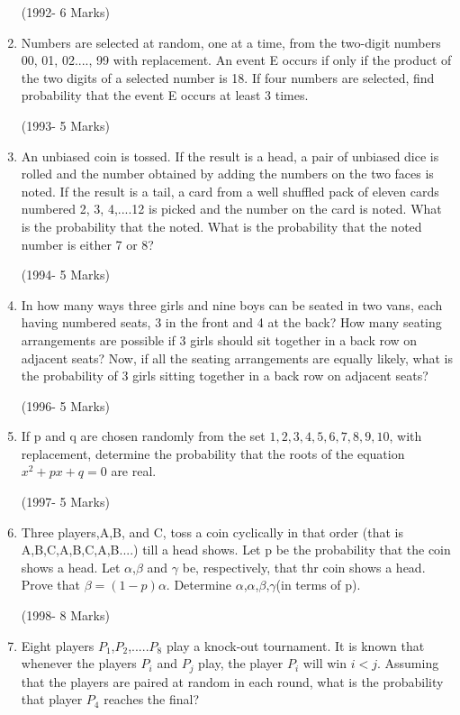 \documentclass[journal,12pt,twocolumn]{IEEEtran}
\theoremstyle{remark}
\begin{document}
\begin{enumerate}
\hfill(1992- 6 Marks)

\item Numbers are selected at random, one at a time, from the two-digit numbers 00, 01, 02...., 99 with replacement. An event E occurs if only if the product of the two digits of a selected number is 18. If four numbers are selected, find probability that the event E occurs at least 3 times.

\hfill(1993- 5 Marks)

\item An unbiased coin is tossed. If the result is a head, a pair of unbiased dice is rolled and the number obtained by adding the numbers on the two faces is noted. If the result is a tail, a card from a well shuffled pack of eleven cards numbered 2, 3, 4,....12 is picked and the number on the card is noted. What is the probability that the noted. What is the probability that the noted number is either 7 or 8?

\hfill(1994- 5 Marks)

\item In how many ways three girls and nine boys can be seated in two vans, each having numbered seats, $3$ in the front and 4 at the back? How many seating arrangements are possible if 3 girls should sit together in a back row on adjacent seats? Now, if all the seating arrangements are equally likely, what is the probability of 3 girls sitting together in a back row on adjacent seats?

\hfill(1996- 5 Marks)

\item If p and q are chosen randomly from the set ${1,2,3,4,5,6,7,8,9,10}$, with replacement, determine the probability that the roots of the equation $x^2+px+q=0$ are real.
                                                      
\hfill(1997- 5 Marks)

\item Three players,A,B, and C, toss a coin cyclically in that order (that is A,B,C,A,B,C,A,B....) till a head shows. Let p be the probability that the coin shows a head. Let $\alpha$,$\beta$ and $\gamma$ be, respectively, that thr coin shows a head. Prove that $\beta=(1-p)\alpha$. Determine $\alpha$,$\alpha$,$\beta$,$\gamma$(in terms of p).

\hfill(1998- 8 Marks)

\item Eight players $P_{1}$,$P_{2}$,.....$P_{8}$ play a knock-out tournament. It is known that whenever the players $P_{i}$ and $P_{j}$ play, the player $P_{i}$ will win $i<j$. Assuming that the players are paired at random in each round, what is the probability that player $P_{4}$ reaches the final?


\end{enumerate}
\end{document}
